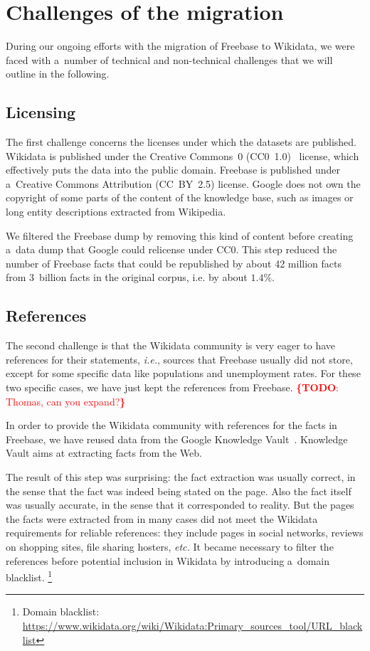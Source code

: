 \documentclass{acm_proc_article-sp}
\newcommand{\todo}[1]{\noindent\textcolor{red}{{\bf \{TODO}: #1{\bf \}}}}
\begin{document}
\section{Challenges of the migration}\label{sec:challenges-of-the-migration}

During our ongoing efforts with the migration of Freebase to Wikidata,
we were faced with a~number of technical and non-technical challenges
that we will outline in the following.

\subsection{Licensing}
\label{sec:licensing}

The first challenge concerns the licenses under which the datasets are published.
Wikidata is published under the Creative Commons~0 (CC0~1.0)~\cite{cc0} license,
which effectively puts the data into the public domain.
Freebase is published under a~Creative Commons Attribution (CC~BY~2.5) license.
Google does not own the copyright of some parts of the content of the knowledge base,
such as images or long entity descriptions extracted from Wikipedia.

We filtered the Freebase dump by removing this kind of content
before creating a~data dump that Google could relicense under CC0.
This step reduced the number of Freebase facts that could be republished by about 42 million facts
from 3~billion facts in the original corpus, i.e. by about $1.4\%$.

\subsection{References}

The second challenge is that the Wikidata community is very eager to have references
for their statements, \emph{i.e.}, sources that Freebase usually did not store,
except for some specific data like populations and unemployment rates.
For these two specific cases, we have just kept the references from Freebase.
\todo{Thomas, can you expand?}

In order to provide the Wikidata community with references for the facts in Freebase,
we have reused data from the Google
Knowledge Vault~\cite{dong2014knowledge}. Knowledge Vault aims at extracting facts from the Web.

The result of this step was surprising: 
the fact extraction was usually correct, in the sense that the fact was indeed being stated on the page.
Also the fact itself was usually accurate, in the sense that it corresponded to reality.
But the pages the facts were extracted from in many cases did not meet
the Wikidata requirements for reliable references:
they include pages in social networks, reviews on shopping sites, file sharing hosters, \emph{etc.}
It became necessary to filter the references before potential inclusion in Wikidata
by introducing a~domain blacklist.%
\footnote{Domain blacklist:
\url{https://www.wikidata.org/wiki/Wikidata:Primary_sources_tool/URL_blacklist}}
\end{document}
